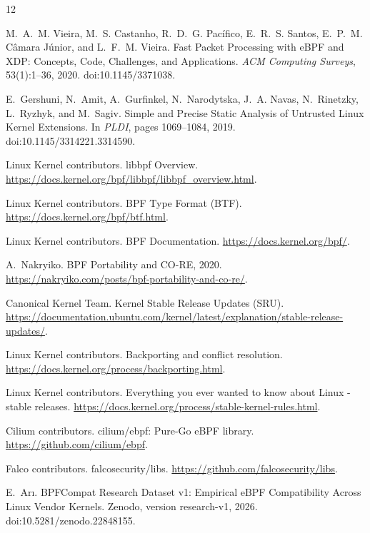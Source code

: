 \documentclass[10pt]{article}
\begin{document}
\begin{thebibliography}{12}

M.~A.~M. Vieira, M.~S. Castanho, R.~D.~G. Pac\'ifico, E.~R.~S. Santos,
E.~P.~M. C\^amara J\'unior, and L.~F.~M. Vieira.
\newblock Fast Packet Processing with eBPF and XDP: Concepts, Code, Challenges, and Applications.
\newblock \emph{ACM Computing Surveys}, 53(1):1--36, 2020. doi:10.1145/3371038.

E.~Gershuni, N.~Amit, A.~Gurfinkel, N.~Narodytska, J.~A. Navas,
N.~Rinetzky, L.~Ryzhyk, and M.~Sagiv.
\newblock Simple and Precise Static Analysis of Untrusted Linux Kernel Extensions.
\newblock In \emph{PLDI}, pages 1069--1084, 2019. doi:10.1145/3314221.3314590.

Linux Kernel contributors.
\newblock libbpf Overview.
\newblock \url{https://docs.kernel.org/bpf/libbpf/libbpf_overview.html}.

Linux Kernel contributors.
\newblock BPF Type Format (BTF).
\newblock \url{https://docs.kernel.org/bpf/btf.html}.

Linux Kernel contributors.
\newblock BPF Documentation.
\newblock \url{https://docs.kernel.org/bpf/}.

A.~Nakryiko.
\newblock BPF Portability and CO-RE, 2020.
\newblock \url{https://nakryiko.com/posts/bpf-portability-and-co-re/}.

Canonical Kernel Team.
\newblock Kernel Stable Release Updates (SRU).
\newblock \url{https://documentation.ubuntu.com/kernel/latest/explanation/stable-release-updates/}.

Linux Kernel contributors.
\newblock Backporting and conflict resolution.
\newblock \url{https://docs.kernel.org/process/backporting.html}.

Linux Kernel contributors.
\newblock Everything you ever wanted to know about Linux -stable releases.
\newblock \url{https://docs.kernel.org/process/stable-kernel-rules.html}.

Cilium contributors.
\newblock cilium/ebpf: Pure-Go eBPF library.
\newblock \url{https://github.com/cilium/ebpf}.

Falco contributors.
\newblock falcosecurity/libs.
\newblock \url{https://github.com/falcosecurity/libs}.

E.~Ar{\i}.
\newblock BPFCompat Research Dataset v1: Empirical eBPF Compatibility Across Linux Vendor Kernels.
\newblock Zenodo, version research-v1, 2026. doi:10.5281/zenodo.22848155.

\end{thebibliography}
\end{document}
